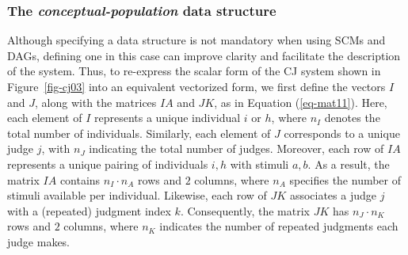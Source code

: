 \documentclass[
  authoryear,
  review,
  1p]{elsarticle}
\begin{document}
\subsubsection{\texorpdfstring{The \emph{conceptual-population} data
structure}{The conceptual-population data structure}}\label{sec-theory-theoretical_P2}

Although specifying a data structure is not mandatory when using SCMs
and DAGs, defining one in this case can improve clarity and facilitate
the description of the system. Thus, to re-express the scalar form of
the CJ system shown in Figure~\ref{fig-cj03} into an equivalent
vectorized form, we first define the vectors \(I\) and \(J\), along with
the matrices \(IA\) and \(JK\), as in Equation (\ref{eq-mat11}). Here,
each element of \(I\) represents a unique individual \(i\) or \(h\),
where \(n_{I}\) denotes the total number of individuals. Similarly, each
element of \(J\) corresponds to a unique judge \(j\), with \(n_{J}\)
indicating the total number of judges. Moreover, each row of \(IA\)
represents a unique pairing of individuals \(i, h\) with stimuli
\(a, b\). As a result, the matrix \(IA\) contains \(n_{I} \cdot n_{A}\)
rows and \(2\) columns, where \(n_{A}\) specifies the number of stimuli
available per individual. Likewise, each row of \(JK\) associates a
judge \(j\) with a (repeated) judgment index \(k\). Consequently, the
matrix \(JK\) has \(n_{J} \cdot n_{K}\) rows and \(2\) columns, where
\(n_{K}\) indicates the number of repeated judgments each judge makes.
\end{document}
